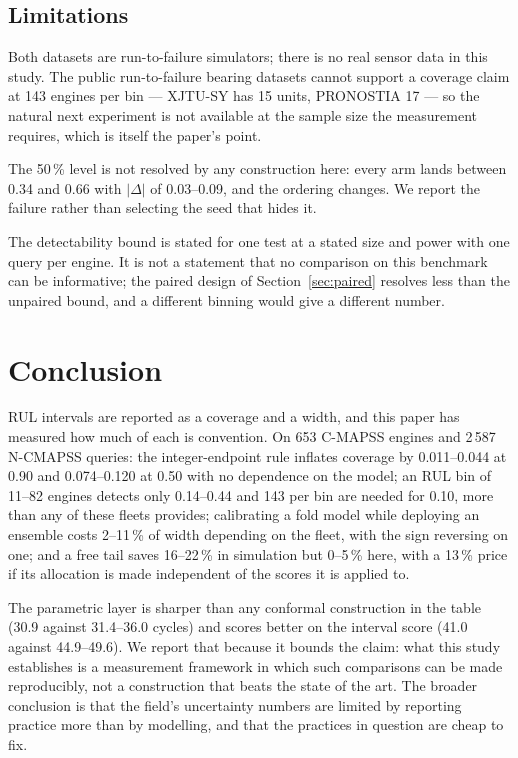 \documentclass[journal]{IEEEtran}
\begin{document}
\subsection{Limitations}

Both datasets are run-to-failure simulators; there is no real sensor data in this study. The
public run-to-failure bearing datasets cannot support a coverage claim at 143 engines per bin
--- XJTU-SY has 15 units, PRONOSTIA 17 --- so the natural next experiment is not available at
the sample size the measurement requires, which is itself the paper's point.

The 50\,\% level is not resolved by any construction here: every arm lands between 0.34 and
0.66 with $|\Delta|$ of 0.03--0.09, and the ordering changes. We report the failure rather than
selecting the seed that hides it.

The detectability bound is stated for one test at a stated size and power with one query per
engine. It is not a statement that no comparison on this benchmark can be informative; the
paired design of Section~\ref{sec:paired} resolves less than the unpaired bound, and a
different binning would give a different number.

\section{Conclusion}\label{sec:concl}

RUL intervals are reported as a coverage and a width, and this paper has measured how much of
each is convention. On 653 C-MAPSS engines and 2\,587 N-CMAPSS queries: the integer-endpoint
rule inflates coverage by 0.011--0.044 at 0.90 and 0.074--0.120 at 0.50 with no dependence on
the model; an RUL bin of 11--82 engines detects only 0.14--0.44 and 143 per bin are needed for
0.10, more than any of these fleets provides; calibrating a fold model while deploying an
ensemble costs 2--11\,\% of width depending on the fleet, with the sign reversing on one; and a
free tail saves 16--22\,\% in simulation but 0--5\,\% here, with a 13\,\% price if its
allocation is made independent of the scores it is applied to.

The parametric layer is sharper than any conformal construction in the table (30.9 against
31.4--36.0 cycles) and scores better on the interval score (41.0 against 44.9--49.6). We report
that because it bounds the claim: what this study establishes is a measurement framework in
which such comparisons can be made reproducibly, not a construction that beats the state of the
art. The broader conclusion is that the field's uncertainty numbers are limited by reporting
practice more than by modelling, and that the practices in question are cheap to fix.
\end{document}
